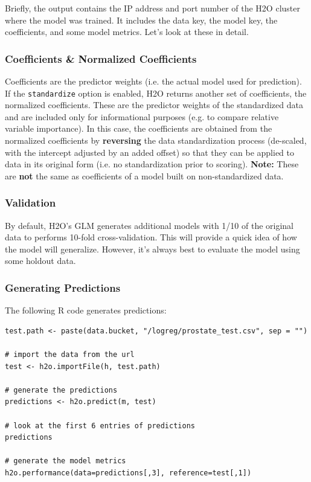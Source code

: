 Briefly, the output contains the IP address and port number of the H2O cluster where the model was trained. It includes the data key, the model key, the coefficients, and  some model metrics. Let's look at these in detail.

\subsubsection{Coefficients \& Normalized Coefficients}
Coefficients are the predictor weights (i.e. the actual model used for prediction).  If the \texttt{standardize} option is enabled, H2O returns another set of coefficients, the normalized coefficients. These are the predictor weights of the standardized data and are included only for informational purposes (e.g. to compare relative variable importance). In this case, the coefficients are obtained from the normalized coefficients by \textbf{reversing} the data standardization process (de-scaled, with the intercept adjusted by an added offset) so that they can be applied to data in its original form (i.e. no standardization prior to scoring). \textbf{Note:} These are \textbf{not} the same as coefficients of a model built on non-standardized data.

\subsubsection{Validation}

By default, H2O's GLM generates additional models with 1/10 of the original data to performs 10-fold cross-validation. This will provide a quick idea of how the model will generalize. However, it's always best to evaluate the model using some holdout data.

\subsubsection{Generating Predictions}

The following R code generates predictions:

\begin{lstlisting}[style=R]
test.path <- paste(data.bucket, "/logreg/prostate_test.csv", sep = "")

# import the data from the url
test <- h2o.importFile(h, test.path)

# generate the predictions
predictions <- h2o.predict(m, test)

# look at the first 6 entries of predictions
predictions

# generate the model metrics
h2o.performance(data=predictions[,3], reference=test[,1])
\end{lstlisting}

